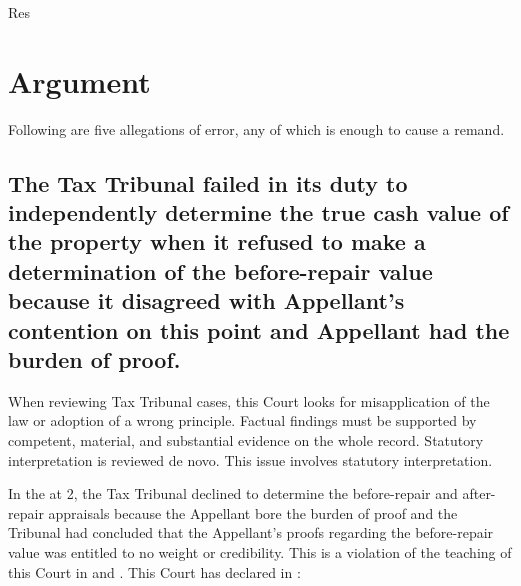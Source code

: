 \documentclass[12pt,\documentclassflag]{michiganCourtOfAppealsBrief}
\begin{document}
Res

\section{Argument}

Following are five allegations of error, any of which is enough to cause a remand. 

\subsection{The Tax Tribunal failed in its duty to independently determine the true cash value of the property when it refused to make a determination of the before-repair value because it disagreed with Appellant's contention on this point and Appellant had the burden of proof.
}

When reviewing Tax Tribunal cases, this Court looks for misapplication of the law or adoption of a wrong principle. Factual findings must be supported by competent, material, and substantial evidence on the whole record. Statutory interpretation is reviewed de novo.  This issue involves statutory interpretation.

In the \orderDenying at 2, the Tax Tribunal declined to determine the before-repair and after-repair appraisals because the Appellant bore the burden of proof and the Tribunal had concluded that the Appellant's proofs regarding the before-repair value was entitled to no weight or credibility.  This is a violation of the teaching of this Court in \cite{Jones & Laughlin} and \cite{Fisher}. This Court has declared in :
\end{document}
